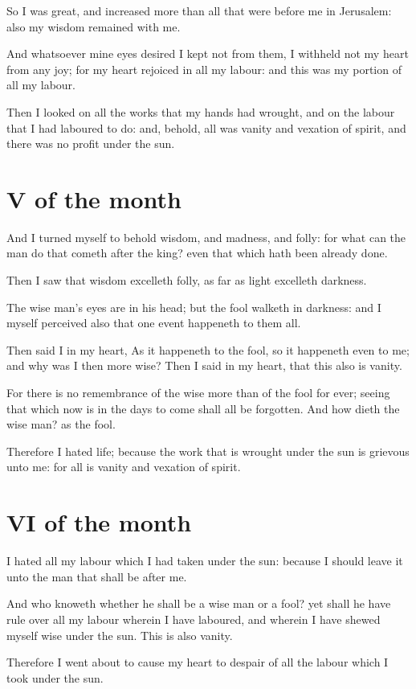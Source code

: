 So I was great, and increased more than all that were before me in Jerusalem: also my wisdom remained with me.

And whatsoever mine eyes desired I kept not from them, I withheld not my heart from any joy; for my heart rejoiced in all my labour: and this was my portion of all my labour.

Then I looked on all the works that my hands had wrought, and on the labour that I had laboured to do: and, behold, all was vanity and vexation of spirit, and there was no profit under the sun.

\section{V of the month}

And I turned myself to behold wisdom, and madness, and folly: for what can the man do that cometh after the king? even that which hath been already done.

Then I saw that wisdom excelleth folly, as far as light excelleth darkness.

The wise man's eyes are in his head; but the fool walketh in darkness: and I myself perceived also that one event happeneth to them all.

Then said I in my heart, As it happeneth to the fool, so it happeneth even to me; and why was I then more wise? Then I said in my heart, that this also is vanity.

For there is no remembrance of the wise more than of the fool for ever; seeing that which now is in the days to come shall all be forgotten. And how dieth the wise man? as the fool.

Therefore I hated life; because the work that is wrought under the sun is grievous unto me: for all is vanity and vexation of spirit.

\section{VI of the month}

\verseamended I hated all my labour which I had taken under the sun: because I should leave it unto the man that shall be after me.

And who knoweth whether he shall be a wise man or a fool? yet shall he have rule over all my labour wherein I have laboured, and wherein I have shewed myself wise under the sun. This is also vanity.

Therefore I went about to cause my heart to despair of all the labour which I took under the sun.


